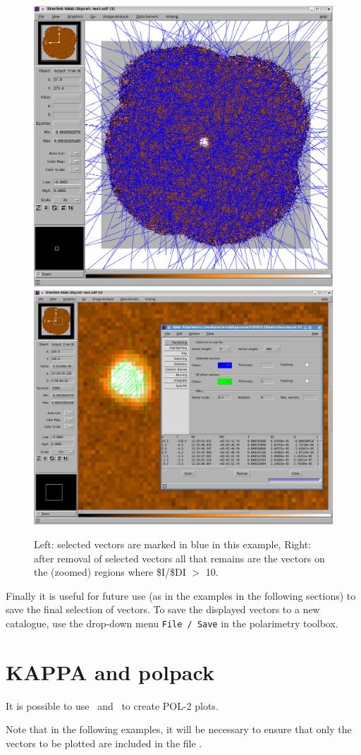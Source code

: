 \begin{figure}[t!]
\begin{center}
\includegraphics[width=0.44\linewidth]{sc22-gaia-plot-vectors-5.png}
\includegraphics[width=0.52\linewidth]{sc22-gaia-plot-vectors-7.png}
\caption [Over Plotting Vectors in GAIA]{ Left: selected vectors are
  marked in blue in this example, Right: after removal of selected
  vectors all that remains are the vectors on the (zoomed) regions
  where \$I/\$DI $>$ 10.}
\label{fig:gaiavectorsfinal}
\end{center}
\end{figure}


Finally it is useful for future use (as in the examples in the
following sections) to save the final selection of vectors. To save the
displayed vectors to a new catalogue, use the drop-down menu
\texttt{File / Save} in the polarimetry toolbox.

\section{KAPPA and polpack}

It is possible to use \Kappa\ and \polpack\ to create POL-2 plots.

\begin{terminalv}
\end{terminalv}

Note that in the following examples, it will be necessary to ensure
that only the vectors to be plotted are included in the file
.

